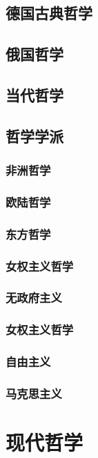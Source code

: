\documentclass[UTF8]{../RepresentationUniverse}
\begin{document}
    \section{德国古典哲学}
    \section{俄国哲学}
    

    
    \section{当代哲学}

\section{哲学学派}
    \subsection{非洲哲学}
    \subsection{欧陆哲学}
    \subsection{东方哲学}
    \subsection{女权主义哲学}
    \subsection{无政府主义}
    \subsection{女权主义哲学}
    \subsection{自由主义}
    \subsection{马克思主义}




\chapter{现代哲学}
\end{document}
